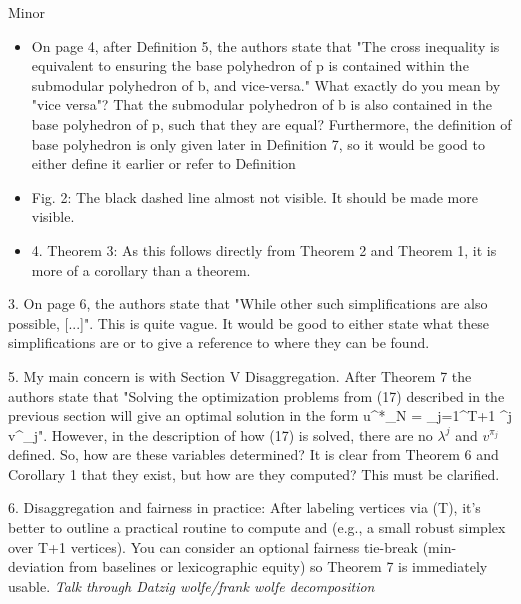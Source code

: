 
Minor \begin{itemize}
    \item On page 4, after Definition 5, the authors state that "The cross inequality is equivalent to ensuring the base polyhedron of p is contained within the submodular polyhedron of b, and vice-versa." What exactly do you mean by "vice versa"? That the submodular polyhedron of b is also contained in the base polyhedron of p, such that they are equal? Furthermore, the definition of base polyhedron is only given later in Definition 7, so it would be good to either define it earlier or refer to Definition 
    \item Fig. 2: The black dashed line almost not visible. It should be made more visible.
    \item 4. Theorem 3: As this follows directly from Theorem 2 and Theorem 1, it is more of a corollary than a theorem.
\end{itemize}


3. On page 6, the authors state that "While other such simplifications are also possible, [...]". This is quite vague. It would be good to either state what these simplifications are or to give a reference to where they can be found.

5. My main concern is with Section V Disaggregation. After Theorem 7 the authors state that "Solving the optimization problems from (17) described in the previous section will give an optimal solution in the form u^*_N = \sum_{j=1}^{T+1} \lambda^j v^{\pi_j}". However, in the description of how (17) is solved, there are no $\lambda^j$ and $v^{\pi_j}$ defined. So, how are these variables determined? It is clear from Theorem 6 and Corollary 1 that they exist, but how are they computed? This must be clarified.

6. Disaggregation and fairness in practice: After labeling vertices via (\tilde T), it's better to outline a practical routine to compute \lambda and \Pi (e.g., a small robust simplex over T{+}1 vertices). You can consider an optional fairness tie-break (min-deviation from baselines or lexicographic equity) so Theorem 7 is immediately usable.
\textit{Talk through Datzig wolfe/frank wolfe decomposition}

